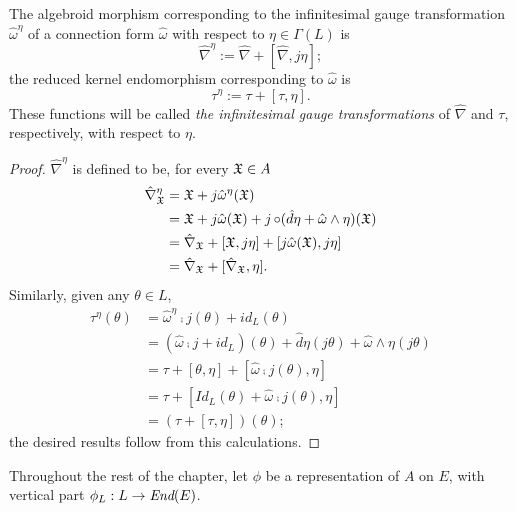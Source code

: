 \begin{proposition}\label{propositionInfinitesimalGaugeTransformationOfAlgebroidEndomorphismOfConnection}
The algebroid morphism corresponding to the infinitesimal gauge transformation $\hat \omega^\eta$ of a connection form $\hat \omega$ with respect to $\eta \in \Gamma(L)$ is 
\begin{equation}
    \hat \nabla^\eta := \hat \nabla + [\hat \nabla, j\eta];
\end{equation}
the reduced kernel endomorphism corresponding to $\hat \omega$ is
\begin{equation}
    \tau^\eta := \tau + [\tau, \eta].
\end{equation}
These functions will be called \emph{the infinitesimal gauge transformations} of $\hat \nabla$ and $\tau$, respectively, with respect to $\eta$.
\end{proposition}
\begin{proof}
$\hat \nabla^\eta$ is defined to be, for every $\mathfrak{X} \in A$
\begin{align*}
    \hat \nabla^\eta_{\mathfrak{X}} &=
        \mathfrak{X} + j\hat \omega^\eta(\mathfrak{X}) \\
        &= \mathfrak{X} + j\hat \omega(\mathfrak{X}) + j \operatorname{\circ} (\hat d \eta + \hat \omega \wedge \eta)(\mathfrak{X}) \\
        &= \hat \nabla_{\mathfrak{X}} + [\mathfrak{X}, j\eta] + [j\hat \omega (\mathfrak{X}), j\eta]\\
        &= \hat \nabla_{\mathfrak{X}} + [\hat \nabla_{\mathfrak{X}}, \eta].
\end{align*}
Similarly, given any $\theta \in L$,
\begin{align*}
    \tau^\eta (\theta)
        &= \hat \omega^\eta \comp j(\theta) + id_L(\theta) \\
        &= (\hat \omega \comp j + id_L)(\theta) + \hat d \eta (j \theta) + \hat \omega \wedge \eta(j \theta)\\
        &= \tau + [\theta, \eta] + [\hat \omega \comp j(\theta), \eta] \\
        &= \tau + [Id_L(\theta) + \hat \omega \comp j(\theta) , \eta]\\
        &= (\tau + [\tau, \eta])(\theta);
\end{align*}
the desired results follow from this calculations.
\end{proof}


\lin

Throughout the rest of the chapter, let $\phi$ be a representation of $A$ on $E$, with vertical part $\phi_L: L \to \End(E)$.

